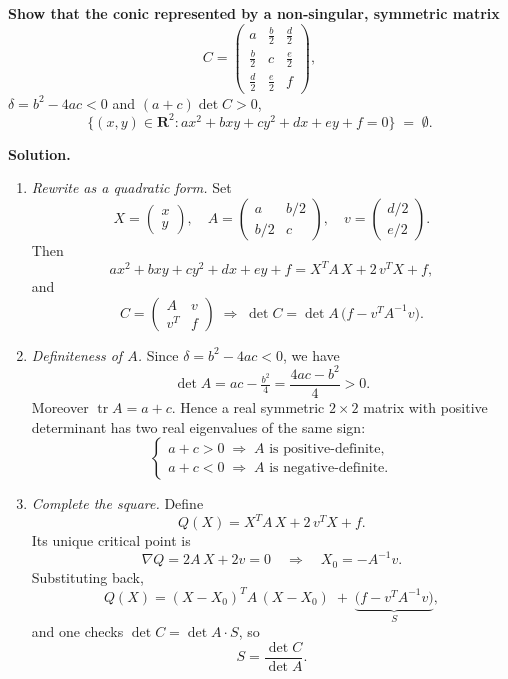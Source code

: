 \textbf{Show that the conic represented by a non‐singular, symmetric matrix}
\[
C = \begin{pmatrix}
a & \tfrac{b}{2} & \tfrac{d}{2} \\[6pt]
\tfrac{b}{2} & c & \tfrac{e}{2} \\[6pt]
\tfrac{d}{2} & \tfrac{e}{2} & f
\end{pmatrix},
\]
 \(\delta = b^2 - 4ac < 0\) and \((a+c)\det C > 0\), 
\[
\bigl\{(x,y)\in\mathbf R^2 : a x^2 + bxy + c y^2 + d x + e y + f = 0 \bigr\}
\;=\;\emptyset.
\]

\bigskip

\noindent\textbf{Solution.}
\begin{enumerate}
  \item \emph{Rewrite as a quadratic form.}  
    Set
    \[
      X = \begin{pmatrix}x\\y\end{pmatrix}, 
      \quad
      A = \begin{pmatrix}a & b/2\\[3pt]b/2 & c\end{pmatrix}, 
      \quad
      v = \begin{pmatrix}d/2\\[3pt]e/2\end{pmatrix}.
    \]
    Then
    \[
      a x^2 + bxy + c y^2 + d x + e y + f
      = X^T A\,X + 2\,v^T X + f,
    \]
    and
    \[
      C = \begin{pmatrix} A & v \\[3pt] v^T & f \end{pmatrix}
      \;\Longrightarrow\;
      \det C = \det A \,\bigl(f - v^T A^{-1}v\bigr).
    \]

  \item \emph{Definiteness of \(A\).}  
    Since \(\delta = b^2 - 4ac < 0\), we have
    \[
      \det A = ac - \tfrac{b^2}{4} = \frac{4ac - b^2}{4} > 0.
    \]
    Moreover \(\operatorname{tr} A = a + c\).  Hence a real symmetric \(2\times2\) matrix with positive determinant has two real eigenvalues of the same sign:
    \[
      \begin{cases}
        a + c > 0 \;\Longrightarrow\;A\text{ is positive‐definite},\\
        a + c < 0 \;\Longrightarrow\;A\text{ is negative‐definite}.
      \end{cases}
    \]

  \item \emph{Complete the square.}  
    Define
    \[
      Q(X) = X^T A\,X + 2\,v^T X + f.
    \]
    Its unique critical point is
    \[
      \nabla Q = 2A\,X + 2v = 0
      \quad\Longrightarrow\quad
      X_0 = -A^{-1}v.
    \]
    Substituting back,
    \[
      Q(X) = (X - X_0)^T A\,(X - X_0)
      \;+\;\underbrace{\bigl(f - v^T A^{-1}v\bigr)}_{S},
    \]
    and one checks
    \(\det C = \det A\cdot S\), so
    \[
      S = \frac{\det C}{\det A}.
    \]


\end{enumerate}

